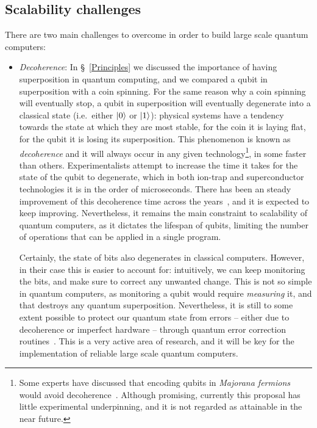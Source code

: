 \subsection{Scalability challenges}
\label{Challenges}

There are two main challenges to overcome in order to build large scale quantum computers:

\begin{itemize}

  \item \textit{Decoherence}: In \S~\ref{Principles} we discussed the importance of having superposition in quantum computing, and we compared a qubit in superposition with a coin spinning. For the same reason why a coin spinning will eventually stop, a qubit in superposition will eventually degenerate into a classical state (i.e.\ either \(\vert 0 \rangle\) or \(\vert 1 \rangle\)): physical systems have a tendency towards the state at which they are most stable, for the coin it is laying flat, for the qubit it is losing its superposition. This phenomenon is known as \textit{decoherence} and it will always occur in any given technology\footnote{Some experts have discussed that encoding qubits in \textit{Majorana fermions} would avoid decoherence~\citep{Majorana}. Although promising, currently this proposal has little experimental underpinning, and it is not regarded as attainable in the near future.}, in some faster than others. Experimentalists attempt to increase the time it takes for the state of the qubit to degenerate, which in both ion-trap and superconductor technologies it is in the order of microseconds. There has been an steady improvement of this decoherence time across the years~\citep{SurveyDecoherence}, and it is expected to keep improving. Nevertheless, it remains the main constraint to scalability of quantum computers, as it dictates the lifespan of qubits, limiting the number of operations that can be applied in a single program. 

  Certainly, the state of bits also degenerates in classical computers. However, in their case this is easier to account for: intuitively, we can keep monitoring the bits, and make sure to correct any unwanted change. This is not so simple in quantum computers, as monitoring a qubit would require \textit{measuring} it, and that destroys any quantum superposition. Nevertheless, it is still to some extent possible to protect our quantum state from errors -- either due to decoherence or imperfect hardware -- through quantum error correction routines~\citep{QuantumErrorCorrection}. This is a very active area of research, and it will be key for the implementation of reliable large scale quantum computers.



\end{itemize}
